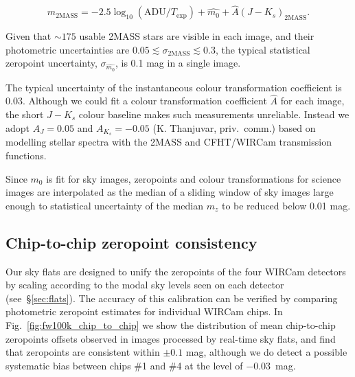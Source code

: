 \documentclass[iop]{emulateapj}
\newcommand{\comment}[1]{\textcolor{OliveGreen}{\textit{#1}}} %
\newcommand{\Fig}[1]{Fig.~\ref{fig:#1}}  %
\newcommand{\Sec}[1]{\S\ref{sec:#1}}  %
\begin{document}
\begin{equation}
  \label{eq:photcal}
  m_\mathrm{2MASS} = -2.5 \log_{10}(\mathrm{ADU}/T_\mathrm{exp}) + \hat{m_0} + \hat{A} (J-K_s)_\mathrm{2MASS}.
\end{equation}

Given that $\sim 175$ usable 2MASS stars are visible in each image, and their photometric uncertainties are $0.05 \lesssim \sigma_{\mathrm{2MASS}} \lesssim 0.3$, the typical statistical zeropoint uncertainty, $\sigma_{\hat{m_0}}$, is 0.1 mag in a single image.

The typical uncertainty of the instantaneous colour transformation coefficient is 0.03.
Although we could fit a colour transformation coefficient $\hat{A}$ for each image, the short $J-K_s$ colour baseline makes such measurements unreliable. Instead we adopt $A_J = 0.05$ and $A_{K_s} = -0.05$ (K. Thanjuvar, priv.\ comm.) based on modelling stellar spectra with the 2MASS and CFHT/WIRCam transmission functions.

Since $m_0$ is fit for sky images, zeropoints and colour transformations for science images are interpolated as the median of a sliding window of sky images large enough to statistical uncertainty of the median $m_z$ to be reduced below 0.01 mag.

\subsection{Chip-to-chip zeropoint consistency}
\label{sec:chip_zp}

Our sky flats are designed to unify the zeropoints of the four WIRCam detectors by scaling according to the modal sky levels seen on each detector (see~\Sec{flats}).
The accuracy of this calibration can be verified by comparing photometric zeropoint estimates for individual WIRCam chips.
In \Fig{fw100k_chip_to_chip} we show the distribution of mean chip-to-chip zeropoints offsets observed in images processed by real-time sky flats, and find that zeropoints are consistent within $\pm 0.1$ mag, although we do detect a possible systematic bias between chips \#1 and \#4 at the level of $-0.03$~mag.
\end{document}
